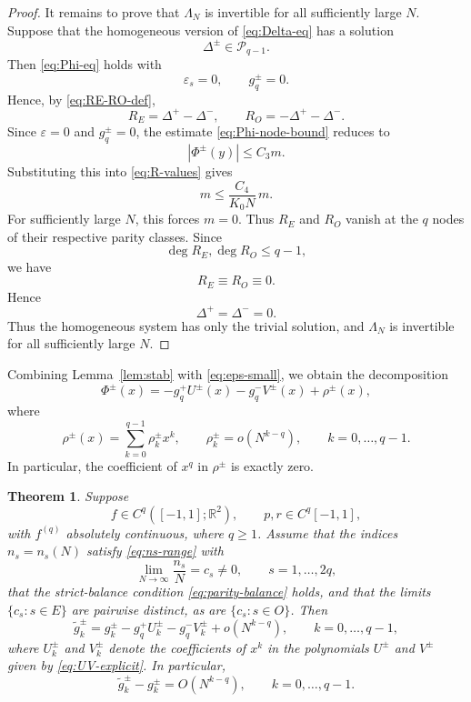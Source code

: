 \documentclass[11pt,a4paper]{article}
\newtheorem{theorem}{Theorem}[section]
\theoremstyle{definition}
\begin{document}
\begin{proof}
It remains to prove that $\Lambda_N$ is invertible for all sufficiently
large $N$. 
Suppose that the homogeneous version of \eqref{eq:Delta-eq} has a
solution
\[
\Delta^\pm\in\mathcal P_{q-1}.
\]
Then \eqref{eq:Phi-eq} holds with
\[
\varepsilon_s=0,
\qquad
g_q^\pm=0.
\]
Hence, by
\eqref{eq:RE-RO-def},
\[
R_E=\Delta^+-\Delta^-,
\qquad
R_O=-\Delta^+-\Delta^-.
\]
Since $\varepsilon=0$ and $g_q^\pm=0$, the estimate
\eqref{eq:Phi-node-bound} reduces to
\[
|\Phi^\pm(y)|\leq C_3m.
\]
Substituting this into \eqref{eq:R-values} gives
\[
m\leq \frac{C_4}{K_0N}\,m.
\]
For sufficiently large $N$, this forces $m=0$. Thus $R_E$ and $R_O$
vanish at the $q$ nodes of their respective parity classes. Since
\[
\deg R_E,\deg R_O\leq q-1,
\]
we have
\[
R_E\equiv R_O\equiv0.
\]
Hence
\[
\Delta^+=\Delta^-=0.\]
Thus the homogeneous system has only the trivial solution, and
$\Lambda_N$ is invertible for all sufficiently large $N$.
\end{proof}




Combining Lemma~\ref{lem:stab} with \eqref{eq:eps-small}, we obtain
the decomposition
\begin{equation}\label{eq:Phi-decomp-2}
\Phi^\pm(x)
=
-g_q^+U^\pm(x)-g_q^-V^\pm(x)+\rho^\pm(x),
\end{equation}
where
\[
\rho^\pm(x)
=
\sum_{k=0}^{q-1}\rho_k^\pm x^k,
\qquad
\rho_k^\pm=o(N^{k-q}),
\qquad
k=0,\dots,q-1.
\]
In particular, the coefficient of $x^q$ in $\rho^\pm$ is exactly
zero.

\begin{theorem}\label{thm:gjumps}
Suppose
\[
f\in C^q([-1,1];\mathbb R^2),
\qquad
p,r\in C^q[-1,1],
\]
with $f^{(q)}$ absolutely continuous, where $q\geq1$. Assume that the
indices $n_s=n_s(N)$ satisfy \eqref{eq:ns-range} with
\[
\lim_{N\to\infty}\frac{n_s}{N}=c_s\neq0,
\qquad
s=1,\dots,2q,
\]
that the strict-balance condition \eqref{eq:parity-balance} holds, and
that the limits $\{c_s:s\in E\}$ are pairwise distinct, as are
$\{c_s:s\in O\}$. Then
\begin{equation}\label{eq:tilde-g-asymp}
\widetilde g_k^\pm
=
g_k^\pm
-g_q^+U_k^\pm
-g_q^-V_k^\pm
+o(N^{k-q}),
\qquad
k=0,\dots,q-1,
\end{equation}
where $U_k^\pm$ and $V_k^\pm$ denote the coefficients of $x^k$ in
the polynomials $U^\pm$ and $V^\pm$ given by
\eqref{eq:UV-explicit}. In particular,
\[
\widetilde g_k^\pm-g_k^\pm
=
O(N^{k-q}),
\qquad
k=0,\dots,q-1.
\]
\end{theorem}
\end{document}
